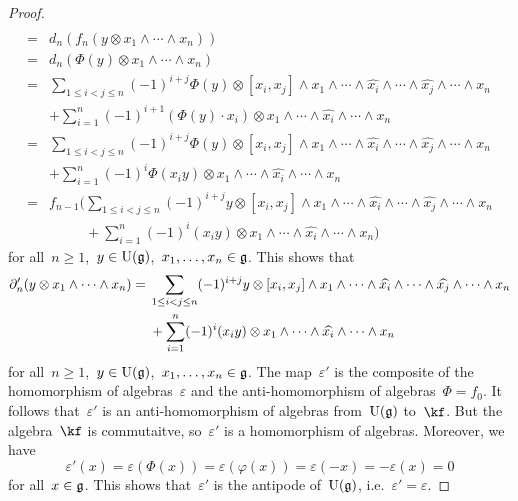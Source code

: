 \begin{proof}
\begin{align*}
    \\
    ={}&
    d_n( f_n( y \otimes x_1 \wedge \dotsb \wedge x_n ) )
    \\
    ={}&
    d_n( \Phi(y) \otimes x_1 \wedge \dotsb \wedge x_n )
    \\
    ={}&
    \sum_{1 \leq i < j \leq n}
    (-1)^{i+j}
    \Phi(y) \otimes
    [x_i, x_j] \wedge
    x_1 \wedge \dotsb \wedge \widehat{x_i} \wedge \dotsb \wedge \widehat{x_j} \wedge \dotsb \wedge x_n
    \\
    {}&
    +
    \sum_{i=1}^n
    (-1)^{i+1}
    ( \Phi(y) \cdot x_i )
    \otimes
    x_1 \wedge \dotsb \wedge \widehat{x_i} \wedge \dotsb \wedge x_n
    \\
    ={}&
    \sum_{1 \leq i < j \leq n}
    (-1)^{i+j}
    \Phi(y) \otimes
    [x_i, x_j] \wedge
    x_1 \wedge \dotsb \wedge \widehat{x_i} \wedge \dotsb \wedge \widehat{x_j} \wedge \dotsb \wedge x_n
    \\
    {}&
    +
    \sum_{i=1}^n
    (-1)^i
    \Phi(x_i y)
    \otimes
    x_1 \wedge \dotsb \wedge \widehat{x_i} \wedge \dotsb \wedge x_n
    \\
    ={}&
    f_{n-1}
    \Biggl(
      \sum_{1 \leq i < j \leq n}
      (-1)^{i+j}
      y \otimes
      [x_i, x_j] \wedge
      x_1 \wedge \dotsb \wedge \widehat{x_i} \wedge \dotsb \wedge \widehat{x_j} \wedge \dotsb \wedge x_n
    \\
      {}&
      \phantom{ f_{n-1} \Biggl( }
      +
      \sum_{i=1}^n
      (-1)^i
      (x_i y)
      \otimes
      x_1 \wedge \dotsb \wedge \widehat{x_i} \wedge \dotsb \wedge x_n
    \Biggr)
  \end{align*}
  for all~$n \geq 1$,~$y \in \operatorname{U}(\mathfrak{g})$,~$x_1, \dotsc, x_n \in \mathfrak{g}$.
  This shows that
  \begin{align*}
    \partial'_n( y \otimes x_1 \wedge \dotsb \wedge x_n )
    ={}&
    \sum_{1 \leq i < j \leq n}
    (-1)^{i+j}
    y \otimes
    [x_i, x_j] \wedge
    x_1 \wedge \dotsb \wedge \widehat{x_i} \wedge \dotsb \wedge \widehat{x_j} \wedge \dotsb \wedge x_n
    \\
    {}&
    +
    \sum_{i=1}^n
    (-1)^i
    (x_i y)
    \otimes
    x_1 \wedge \dotsb \wedge \widehat{x_i} \wedge \dotsb \wedge x_n
  \end{align*}
  for all~$n \geq 1$,~$y \in \operatorname{U}(\mathfrak{g})$,~$x_1, \dotsc, x_n \in \mathfrak{g}$.
  The map~$\varepsilon'$ is the composite of the homomorphism of algebras~$\varepsilon$ and the anti-homomorphism of algebras~$\Phi = f_0$.
  It follows that~$\varepsilon'$ is an anti-homomorphism of algebras from~$\operatorname{U}(\mathfrak{g})$ to~$\kf$.
  But the algebra~$\kf$ is commutaitve, so~$\varepsilon'$ is a homomorphism of algebras.
  Moreover, we have
  \[
    \varepsilon'(x)
    =
    \varepsilon( \Phi(x) )
    =
    \varepsilon( \varphi(x) )
    =
    \varepsilon( -x )
    =
    - \varepsilon(x)
    =
    0
  \]
  for all~$x \in \mathfrak{g}$.
  This shows that~$\varepsilon'$ is the antipode of~$\operatorname{U}(\mathfrak{g})$, i.e.~$\varepsilon' = \varepsilon$.
  

\end{proof}
